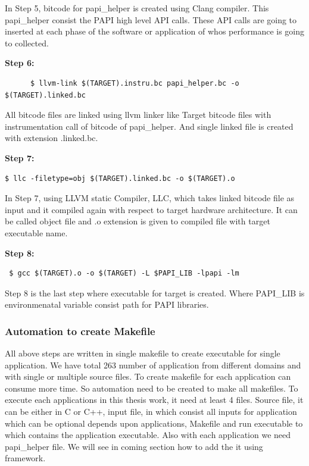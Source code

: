   In Step 5, bitcode for papi\_helper is created using Clang compiler. This papi\_helper consist the PAPI high level API calls. These API calls are going to inserted at each phase of the software or application of whos performance is going to collected.
  
 \textbf{Step 6: }
  \begin{lstlisting}
      $ llvm-link $(TARGET).instru.bc papi_helper.bc -o $(TARGET).linked.bc
  \end{lstlisting} 
  
  All bitcode files are linked using llvm linker like Target bitcode files with instrumentation call of bitcode of papi\_helper.  And single linked file is created with extension .linked.bc.
  
 \textbf{Step 7: }
  \begin{lstlisting}
$ llc -filetype=obj $(TARGET).linked.bc -o $(TARGET).o
  \end{lstlisting} 
  
  In Step 7, using LLVM static Compiler, LLC, which takes linked bitcode file as input and it compiled again with respect to target hardware architecture. It can be called object file and .o extension is given to compiled file with target executable name.
  
   \textbf{Step 8: }
  \begin{lstlisting}
 $ gcc $(TARGET).o -o $(TARGET) -L $PAPI_LIB -lpapi -lm
  \end{lstlisting} 
  
  Step 8 is the last step where executable for target is created. Where PAPI\_LIB is environmenatal variable consist path for PAPI libraries. 
  
\subsubsection{Automation to create Makefile}
All above steps are written in single makefile to create executable for single application. We have total 263 number of application from different domains and with single or multiple source files. To create makefile for each application can consume more time. So automation need to be created to make all makefiles. To execute each applications in this thesis work, it need at least 4 files. Source file, it can be either in C or C++, input file, in which consist all inputs for application which can be optional depends upon applications, Makefile and run executable to which contains the application executable. Also with each application we need papi\_helper file. We will see in coming section how to add the it using framework. 

